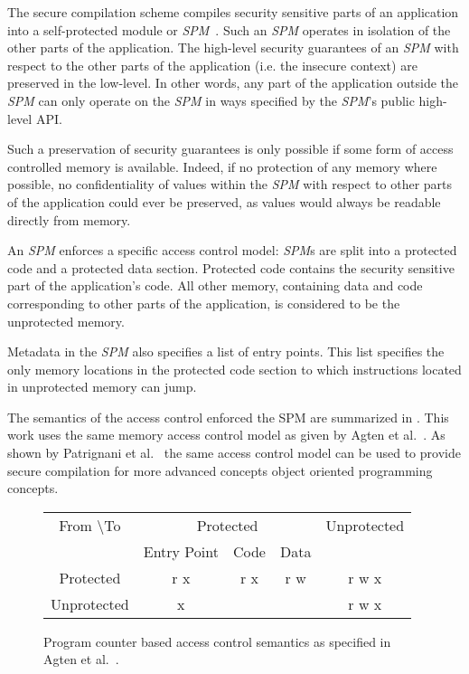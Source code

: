 The secure compilation scheme compiles security sensitive parts of an application into a self-protected module or \emph{SPM}~\cite{PCBAC}.
Such an \emph{SPM} operates in isolation of the other parts of the application.
The high-level security guarantees of an \emph{SPM} with respect to the other parts of the application (i.e. the insecure context) are preserved in the low-level.
In other words, any part of the application outside the \emph{SPM} can only operate on the \emph{SPM} in ways specified by the \emph{SPM}'s public high-level API.

Such a preservation of security guarantees is only possible if some form of access controlled memory is available.
Indeed, if no protection of any memory where possible, no confidentiality of values within the \emph{SPM} with respect to other parts of the application could ever be preserved, as values would always be readable directly from memory.

An \emph{SPM} enforces a specific access control model: \emph{SPM}s are split into a protected code and a protected data section.
Protected code contains the security sensitive part of the application's code.
All other memory, containing data and code corresponding to other parts of the application, is considered to be the unprotected memory.

Metadata in the \emph{SPM} also specifies a list of entry points.
This list specifies the only memory locations in the protected code section to which instructions located in unprotected memory can jump.

The semantics of the access control enforced the SPM are summarized in .
This work uses the same memory access control model as given by Agten et al.~\cite{Agten:2012:SCM:2354412.2355247}.
As shown by Patrignani et al.~\cite{Patrignani} the same access control model can be used to provide secure compilation for more advanced concepts object oriented programming concepts.

\begin{figure}[htb]
    \centering
	\begin{tabular}{|c|c|c|c|c|}
		\hline
		From \textbackslash To & \multicolumn{3}{c|}{Protected} & Unprotected \\
		& Entry Point & Code & Data & \\ \hline
		Protected & r x & r x & r w & r w x \\ \hline
		Unprotected & x & & & r w x \\ \hline
	\end{tabular}
    \caption[PCBAC Semantics]{Program counter based access control semantics as specified in Agten et al.~\cite{Agten:2012:SCM:2354412.2355247}. \label{fig:AccessControlSemantics}}
\end{figure}

